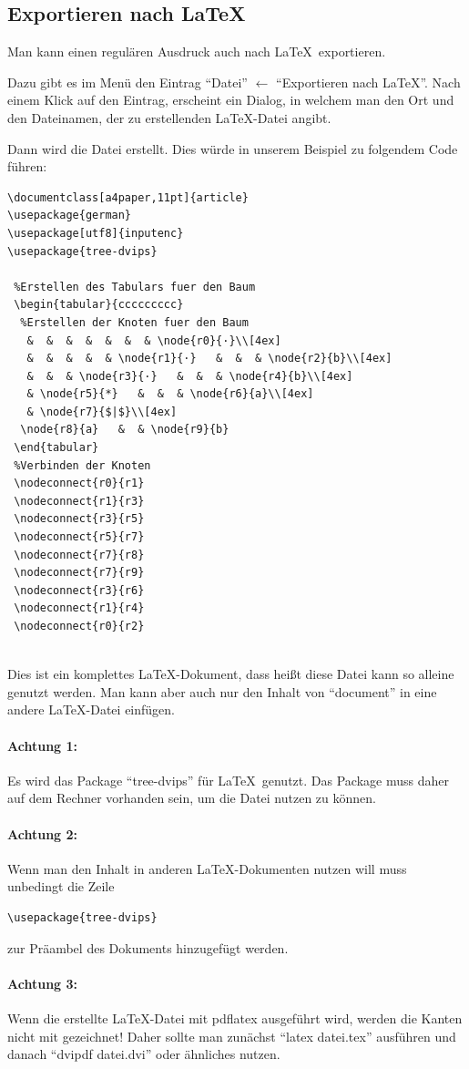 \subsection{Exportieren nach \LaTeX}

Man kann einen regulären Ausdruck auch nach \LaTeX \ exportieren.

Dazu gibt es im Menü den Eintrag "`Datei"' $\leftarrow$ "`Exportieren nach LaTeX"'. Nach einem Klick auf den Eintrag, erscheint ein Dialog, in welchem man den Ort und den Dateinamen, der zu erstellenden \LaTeX-Datei angibt.

Dann wird die Datei erstellt. Dies würde in unserem Beispiel zu folgendem Code führen:

\begin{verbatim}
\documentclass[a4paper,11pt]{article}
\usepackage{german}
\usepackage[utf8]{inputenc}
\usepackage{tree-dvips}

 %Erstellen des Tabulars fuer den Baum
 \begin{tabular}{ccccccccc}
  %Erstellen der Knoten fuer den Baum
   &  &  &  &  &  &  & \node{r0}{·}\\[4ex]
   &  &  &  &  & \node{r1}{·}   &  &  & \node{r2}{b}\\[4ex]
   &  &  & \node{r3}{·}   &  &  & \node{r4}{b}\\[4ex]
   & \node{r5}{*}   &  &  & \node{r6}{a}\\[4ex]
   & \node{r7}{$|$}\\[4ex]
  \node{r8}{a}   &  & \node{r9}{b}
 \end{tabular}
 %Verbinden der Knoten
 \nodeconnect{r0}{r1}
 \nodeconnect{r1}{r3}
 \nodeconnect{r3}{r5}
 \nodeconnect{r5}{r7}
 \nodeconnect{r7}{r8}
 \nodeconnect{r7}{r9}
 \nodeconnect{r3}{r6}
 \nodeconnect{r1}{r4}
 \nodeconnect{r0}{r2}


\end{verbatim}

Dies ist ein komplettes \LaTeX-Dokument, dass heißt diese Datei kann so alleine genutzt werden. Man kann aber auch nur den Inhalt von "`document"' in eine andere \LaTeX-Datei einfügen.

\paragraph*{Achtung 1:} Es wird das Package "`tree-dvips"' für \LaTeX\ genutzt. Das Package muss daher auf dem Rechner vorhanden sein, um die Datei nutzen zu können.

\paragraph*{Achtung 2:} Wenn man den Inhalt in anderen \LaTeX-Dokumenten nutzen will muss unbedingt die Zeile
\begin{verbatim}
\usepackage{tree-dvips}
\end{verbatim}
zur Präambel des Dokuments hinzugefügt werden.

\paragraph*{Achtung 3:} Wenn die erstellte \LaTeX-Datei mit pdflatex ausgeführt wird, werden die Kanten nicht mit gezeichnet! Daher sollte man zunächst "`latex datei.tex"' ausführen und danach "`dvipdf datei.dvi"' oder ähnliches nutzen.
